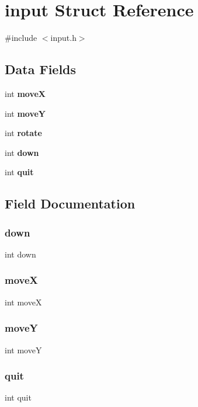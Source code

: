 \section{input Struct Reference}
\label{structinput}


{\ttfamily \#include $<$input.\+h$>$}

\subsection*{Data Fields}
\begin{DoxyCompactItemize}
\item 
int \textbf{ moveX}
\item 
int \textbf{ moveY}
\item 
int \textbf{ rotate}
\item 
int \textbf{ down}
\item 
int \textbf{ quit}
\end{DoxyCompactItemize}


\subsection{Field Documentation}
\mbox{\label{structinput_aac8fc1be53dcc0753b735f20510be9d4}} 
\subsubsection{down}
{\footnotesize\ttfamily int down}

\mbox{\label{structinput_a48e21a10524ffbcb834d193dd04d71bc}} 
\subsubsection{moveX}
{\footnotesize\ttfamily int moveX}

\mbox{\label{structinput_ae7554621a48d3744e8b2642010596445}} 
\subsubsection{moveY}
{\footnotesize\ttfamily int moveY}

\mbox{\label{structinput_a2896431d6a80cd39b3d24b40237612ee}} 
\subsubsection{quit}
{\footnotesize\ttfamily int quit}

